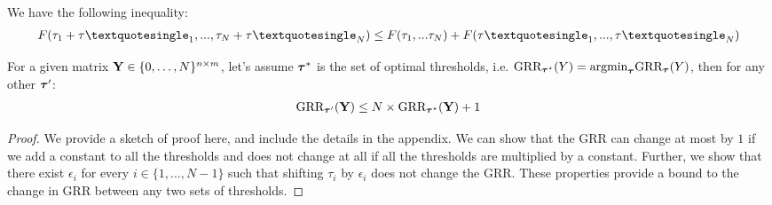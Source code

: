 \documentclass{article}
\newcommand{\cut}[1]{}
\begin{document}
\begin{thm:lemma}
We have the following inequality:
\begin{align}
F(\tau_{1}+\tau\textquotesingle_{1},...,\tau_{N}+\tau\textquotesingle_{N}) \leq  F(\tau_{1},...\tau_{N})+F(\tau\textquotesingle_{1},...,\tau\textquotesingle_{N})
\end{align}
\end{thm:lemma}

\fi
\begin{thm:thm}
\label{thm:thresh}
For a given matrix $\mathbf{Y} \in \{0,\ldots,N\}^{n \times m}$, let's assume ${\boldsymbol{\tau}}^*$ is the set of optimal thresholds, i.e. $ \text{GRR}_{{\boldsymbol{\tau}}^{\star}}(Y)=\text{argmin}_{{\boldsymbol{\tau}}}\text{GRR}_{{\boldsymbol{\tau}}}(Y)$, then for any other ${\boldsymbol{\tau}}'$: %
\begin{align}
\label{thresh}
\text{GRR}_{{\boldsymbol{\tau}}'}(\mathbf{Y}) \leq N\times\text{GRR}_{{\boldsymbol{\tau}}^{\star}}(\mathbf{Y})+1
\end{align}
\begin{proof}
We provide a sketch of proof here, and include the details in the appendix.
%
We can show that the GRR can change at most by $1$ if we add a constant to all the thresholds and does not change at all if all the thresholds are multiplied by a constant. %
%
Further, we show that there exist $\epsilon_i$ for every $i \in \{1,...,N-1\}$ such that shifting $\tau_i$ by $\epsilon_i$ does not change the GRR. %
These properties provide a bound to the change in GRR between any two sets of thresholds. %
\cut{
\begin{thm:lemma}
\label{thm:thr}
We have the following property for \GRR: 
\begin{align}
\GRR_{\tau_{1}+c,...,\tau_{N}+c}(\Y)\leq \GRR_{\tau_1,...,\tau_N}(\Y)+1 
\end{align}
Where $c$ is a real number.
\begin{proof}
We define $\mathbf{B}$ and $\mathbf{B'}$ as follows:
\begin{align}
\mathbf{B} &=\{B|\GRF_{\tau_1,..,.\tau_N}(B)=\Y\}\\

\end{align}
\end{proof}
\end{thm:lemma}}
\end{proof}
\end{thm:thm}
\end{document}
